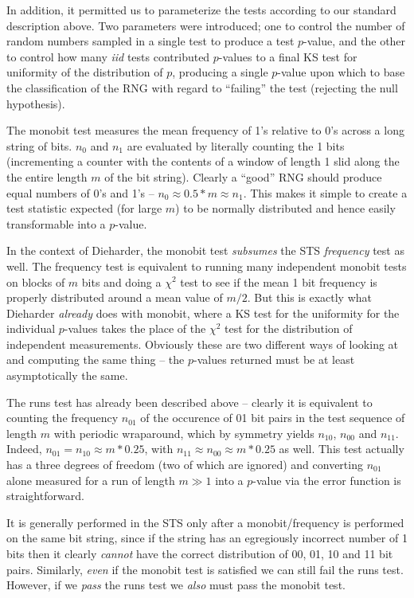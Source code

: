 \documentclass{book}
\begin{document}
In addition, it permitted us to parameterize the tests according to our
standard description above.  Two parameters were introduced; one to
control the number of random numbers sampled in a single test to produce
a test $p$-value, and the other to control how many {\em iid} tests
contributed $p$-values to a final KS test for uniformity of the
distribution of $p$, producing a single $p$-value upon which to base the
classification of the RNG with regard to ``failing'' the test (rejecting
the null hypothesis).

The monobit test measures the mean frequency of 1's relative to 0's
across a long string of bits.  $n_0$ and $n_1$ are evaluated by
literally counting the 1 bits (incrementing a counter with the contents
of a window of length 1 slid along the the entire length $m$ of the bit
string).  Clearly a ``good'' RNG should produce equal numbers of 0's and
1's -- $n_0 \approx 0.5*m \approx n_1$.  This makes it simple to create
a test statistic expected (for large $m$) to be normally distributed and
hence easily transformable into a $p$-value.

In the context of Dieharder, the monobit test {\em subsumes} the STS
{\em frequency} test as well.  The frequency test is equivalent to
running many independent monobit tests on blocks of $m$ bits and doing a
$\chi^2$ test to see if the mean 1 bit frequency is properly distributed
around a mean value of $m/2$.  But this is exactly what Dieharder {\em
already} does with monobit, where a KS test for the uniformity for the
individual $p$-values takes the place of the $\chi^2$ test for the
distribution of independent measurements.  Obviously these are two
different ways of looking at and computing the same thing -- the
$p$-values returned must be at least asymptotically the same.

The runs test has already been described above -- clearly it is
equivalent to counting the frequency $n_{01}$ of the occurence of 01 bit
pairs in the test sequence of length $m$ with periodic wraparound, which
by symmetry yields $n_{10}$, $n_{00}$ and $n_{11}$.  Indeed, $n_{01} =
n_{10} \approx m*0.25$, with $n_{11} \approx n_{00} \approx m*0.25$ as
well.  This test actually has a three degrees of freedom (two of which
are ignored) and converting $n_{01}$ alone measured for a run of length
$m \gg 1$ into a $p$-value via the error function is straightforward.

It is generally performed in the STS only after a monobit/frequency is
performed on the same bit string, since if the string has an egregiously
incorrect number of 1 bits then it clearly {\em cannot} have the correct
distribution of 00, 01, 10 and 11 bit pairs.  Similarly, {\em even} if
the monobit test is satisfied we can still fail the runs test.  However,
if we {\em pass} the runs test we {\em also} must pass the monobit test.
\end{document}
